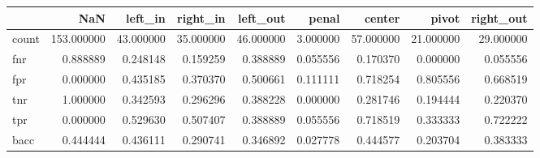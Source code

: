 \begin{tabular}{lrrrrrrrr}
\toprule
{} &         NaN &    left\_in &   right\_in &   left\_out &     penal &     center &      pivot &  right\_out \\
\midrule
count &  153.000000 &  43.000000 &  35.000000 &  46.000000 &  3.000000 &  57.000000 &  21.000000 &  29.000000 \\
fnr   &    0.888889 &   0.248148 &   0.159259 &   0.388889 &  0.055556 &   0.170370 &   0.000000 &   0.055556 \\
fpr   &    0.000000 &   0.435185 &   0.370370 &   0.500661 &  0.111111 &   0.718254 &   0.805556 &   0.668519 \\
tnr   &    1.000000 &   0.342593 &   0.296296 &   0.388228 &  0.000000 &   0.281746 &   0.194444 &   0.220370 \\
tpr   &    0.000000 &   0.529630 &   0.507407 &   0.388889 &  0.055556 &   0.718519 &   0.333333 &   0.722222 \\
bacc  &    0.444444 &   0.436111 &   0.290741 &   0.346892 &  0.027778 &   0.444577 &   0.203704 &   0.383333 \\
\bottomrule
\end{tabular}
